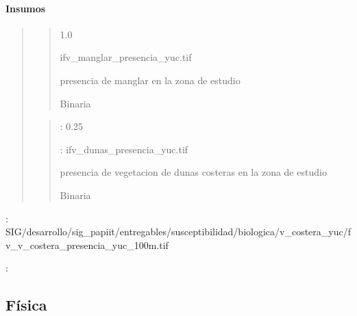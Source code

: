 \documentclass[letterpaper,10pt,spanish]{sphinxmanual}
\begin{document}
\paragraph{Insumos}
\label{\detokenize{sensibilidad:id1}}\begin{quote}

\begin{quote}


 1.0

  ifv\_manglar\_presencia\_yuc.tif

 presencia de manglar en la zona de estudio

 Binaria
\end{quote}


\begin{quote}

: 0.25

: ifv\_dunas\_presencia\_yuc.tif

 presencia de vegetacion de dunas costeras en la zona de estudio

 Binaria
\end{quote}
\end{quote}

: SIG/desarrollo/sig\_papiit/entregables/susceptibilidad/biologica/v\_costera\_yuc/fv\_v\_costera\_presencia\_yuc\_100m.tif


:  


\subsection{Física}
\label{\detokenize{sensibilidad:fisica}}
\end{document}
